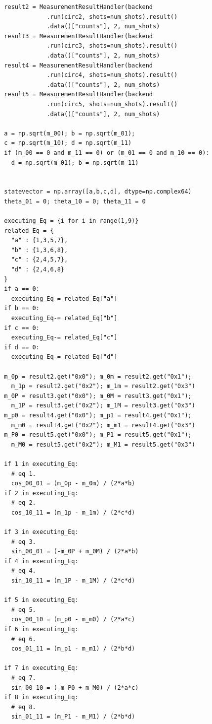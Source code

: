 \documentclass[a4paper, 11pt]{article}
\begin{document}
\begin{verbatim}
  result2 = MeasurementResultHandler(backend
              .run(circ2, shots=num_shots).result()
              .data()["counts"], 2, num_shots)
  result3 = MeasurementResultHandler(backend
              .run(circ3, shots=num_shots).result()
              .data()["counts"], 2, num_shots)
  result4 = MeasurementResultHandler(backend
              .run(circ4, shots=num_shots).result()
              .data()["counts"], 2, num_shots)
  result5 = MeasurementResultHandler(backend
              .run(circ5, shots=num_shots).result()
              .data()["counts"], 2, num_shots)

  a = np.sqrt(m_00); b = np.sqrt(m_01); 
  c = np.sqrt(m_10); d = np.sqrt(m_11)
  if (m_00 == 0 and m_11 == 0) or (m_01 == 0 and m_10 == 0):
    d = np.sqrt(m_01); b = np.sqrt(m_11)
    

  statevector = np.array([a,b,c,d], dtype=np.complex64)
  theta_01 = 0; theta_10 = 0; theta_11 = 0

  executing_Eq = {i for i in range(1,9)}
  related_Eq = {
    "a" : {1,3,5,7},
    "b" : {1,3,6,8},
    "c" : {2,4,5,7},
    "d" : {2,4,6,8}
  }
  if a == 0:
    executing_Eq-= related_Eq["a"]
  if b == 0:
    executing_Eq-= related_Eq["b"]
  if c == 0:
    executing_Eq-= related_Eq["c"]
  if d == 0:
    executing_Eq-= related_Eq["d"]

  m_0p = result2.get("0x0"); m_0m = result2.get("0x1"); 
    m_1p = result2.get("0x2"); m_1m = result2.get("0x3") 
  m_0P = result3.get("0x0"); m_0M = result3.get("0x1"); 
    m_1P = result3.get("0x2"); m_1M = result3.get("0x3") 
  m_p0 = result4.get("0x0"); m_p1 = result4.get("0x1"); 
    m_m0 = result4.get("0x2"); m_m1 = result4.get("0x3") 
  m_P0 = result5.get("0x0"); m_P1 = result5.get("0x1"); 
    m_M0 = result5.get("0x2"); m_M1 = result5.get("0x3") 

  if 1 in executing_Eq:
    # eq 1.
    cos_00_01 = (m_0p - m_0m) / (2*a*b)
  if 2 in executing_Eq:
    # eq 2.
    cos_10_11 = (m_1p - m_1m) / (2*c*d)

  if 3 in executing_Eq:
    # eq 3.
    sin_00_01 = (-m_0P + m_0M) / (2*a*b)
  if 4 in executing_Eq:
    # eq 4.
    sin_10_11 = (m_1P - m_1M) / (2*c*d)

  if 5 in executing_Eq:
    # eq 5.
    cos_00_10 = (m_p0 - m_m0) / (2*a*c)
  if 6 in executing_Eq:
    # eq 6.
    cos_01_11 = (m_p1 - m_m1) / (2*b*d)

  if 7 in executing_Eq:
    # eq 7.
    sin_00_10 = (-m_P0 + m_M0) / (2*a*c)
  if 8 in executing_Eq:
    # eq 8.
    sin_01_11 = (m_P1 - m_M1) / (2*b*d)



\end{verbatim}
\end{document}
